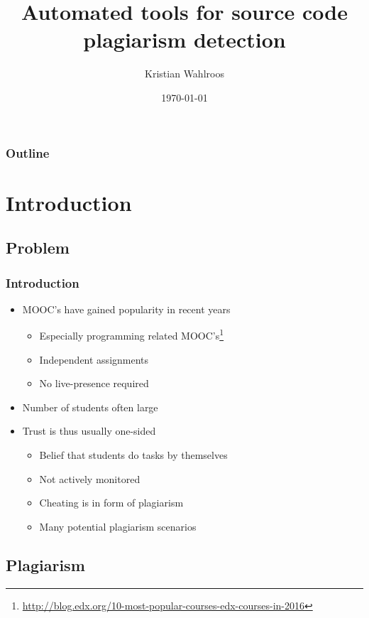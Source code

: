 \documentclass[t,12pt,pdftex]{beamer}
\title{Automated tools for source code plagiarism detection}
\author{Kristian Wahlroos}
\institute{University of Helsinki\\Department of Computer Science}
\date{\today}
\begin{document}

\HyTitle

\begin{frame}
	\frametitle{Outline}
	\tableofcontents
\end{frame}



\section{Introduction}

\subsection{Problem}

\begin{frame}
	\frametitle{Introduction}
	
	\begin{itemize}
		\item MOOC's have gained popularity in recent years
		\begin{itemize}
			\item Especially programming related MOOC's\footnote{\url{http://blog.edx.org/10-most-popular-courses-edx-courses-in-2016}}
			\item Independent assignments
			\item No live-presence required
		\end{itemize}
		\item Number of students often large
		\item Trust is thus usually one-sided
		\begin{itemize}
			\item Belief that students do tasks by themselves
			\item Not actively monitored
			\item Cheating is in form of plagiarism
			\item Many potential plagiarism scenarios
		\end{itemize} 
	\end{itemize}
\end{frame}

\subsection{Plagiarism}
\end{document}
